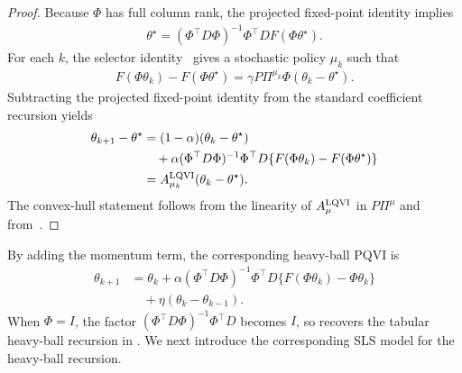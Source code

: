 \documentclass[letterpaper]{article}
\numberwithin{equation}{section}
\begin{document}
\begin{proof}
Because $\Phi$ has full column rank, the projected fixed-point identity implies
\begin{align*}
  \theta^\star=(\Phi^\top D\Phi)^{-1}\Phi^\top DF(\Phi\theta^\star).
\end{align*}
For each $k$, the selector identity~
gives a stochastic policy $\mu_k$ such that
\begin{align*}
  F(\Phi\theta_k)-F(\Phi\theta^\star)
  =\gamma P\Pi^{\mu_k}\Phi(\theta_k-\theta^\star).
\end{align*}
Subtracting the projected fixed-point identity from the standard coefficient
recursion yields
\begin{align*}
  \theta_{k+1}-\theta^\star
  &=(1-\alpha)(\theta_k-\theta^\star)\\
  &\quad+\alpha(\Phi^\top D\Phi)^{-1}\Phi^\top D
    \{F(\Phi\theta_k)-F(\Phi\theta^\star)\}\\
  &=A_{\mu_k}^{\rm LQVI}(\theta_k-\theta^\star).
\end{align*}
The convex-hull statement follows from the linearity of $A_\mu^{\rm LQVI}$ in
$P\Pi^\mu$ and from~.
\end{proof}

By adding the momentum term, the corresponding heavy-ball PQVI is
\begin{equation}
\begin{aligned}
\theta_{k+1}
&=\theta_k
  +\alpha(\Phi^\top D\Phi)^{-1}\Phi^\top D
    \{F(\Phi\theta_k)-\Phi\theta_k\}\\
&\quad+\eta(\theta_k-\theta_{k-1}).
\end{aligned}
\label{eq:linear-fa-hb-update}
\end{equation}
When $\Phi=I$, the factor $(\Phi^\top D\Phi)^{-1}\Phi^\top D$ becomes $I$, so
 recovers the tabular heavy-ball recursion in
. We next introduce the corresponding SLS model for the heavy-ball recursion.
\end{document}
